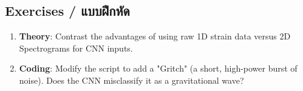 \subsection{Exercises \quad / \quad \textthai{แบบฝึกหัด}}
\begin{enumerate}
    \item \textbf{Theory}: Contrast the advantages of using raw 1D strain data versus 2D Spectrograms for CNN inputs.
    \item \textbf{Coding}: Modify the script to add a "Gritch" (a short, high-power burst of noise). Does the CNN misclassify it as a gravitational wave?
\end{enumerate}
